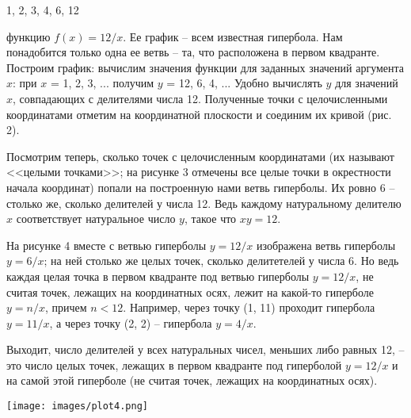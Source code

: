 \documentclass{article}
\begin{document}
\begin{multicols*}{3}
\begin{center}
    1, 2, 3, 4, 6, 12
\end{center}

 функцию $f(x) = 12/x$. Ее график -- всем известная гипербола. Нам понадобится только одна ее ветвь -- та, что расположена в первом квадранте. Построим график: вычислим значения функции для заданных значений аргумента $x$: при $x$ = 1, 2, 3, ... получим $y$ = 12, 6, 4, ... Удобно вычислять $y$ для значений $x$, совпадающих с делителями числа 12. Полученные точки с целочисленными координатами отметим на координатной плоскости и соединим их кривой (рис. 2).

Посмотрим теперь, сколько точек с целочисленным координатами (их называют <<целыми точками>>; на рисунке 3 отмечены все целые точки в окрестности начала координат) попали на построенную нами ветвь гиперболы. Их ровно 6 -- столько же, сколько делителей у числа 12. Ведь каждому натуральному делителю $x$ соответствует натуральное число $y$, такое что $xy =12$.

На рисунке 4 вместе с ветвью гиперболы $y = 12/x$ изображена ветвь гиперболы $y = 6/x$; на ней столько же целых точек, сколько делитетелей у числа 6. Но ведь каждая целая точка в первом квадранте под ветвью гиперболы $y = 12/x$, не считая точек, лежащих на координатных осях, лежит на какой-то гиперболе $y = n/x$, причем $n<12$. Например, через точку (1, 11) проходит гипербола $y = 11/x$, а через точку (2, 2) -- гипербола $y = 4/x$.

Выходит, число делителей у всех натуральных чисел, меньших либо равных 12, -- это число целых точек, лежащих в первом квадранте под гиперболой $y = 12/x$ и на самой этой гиперболе  (не считая точек, лежащих на координатных осях).

\texttt{[image: images/plot4.png]}
\end{multicols*}
\end{document}
